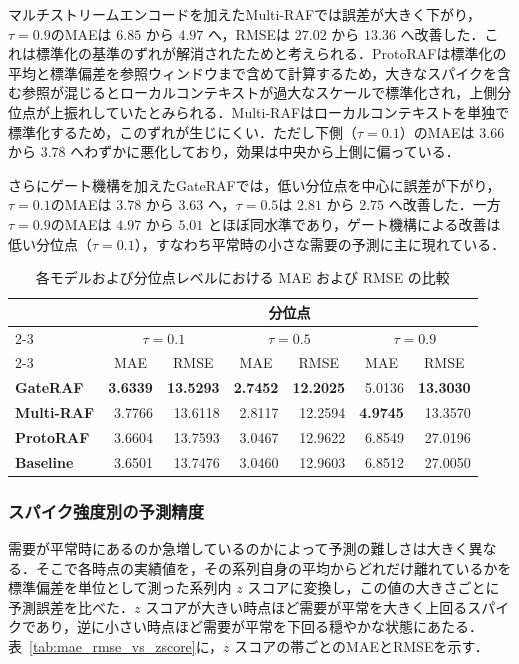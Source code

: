\documentclass[twocolumn, lastpage]{jarticle}
\begin{document}
マルチストリームエンコードを加えたMulti-RAFでは誤差が大きく下がり，$\tau=0.9$のMAEは $6.85$ から $4.97$ へ，RMSEは $27.02$ から $13.36$ へ改善した．これは標準化の基準のずれが解消されたためと考えられる．ProtoRAFは標準化の平均と標準偏差を参照ウィンドウまで含めて計算するため，大きなスパイクを含む参照が混じるとローカルコンテキストが過大なスケールで標準化され，上側分位点が上振れしていたとみられる．Multi-RAFはローカルコンテキストを単独で標準化するため，このずれが生じにくい．ただし下側（$\tau=0.1$）のMAEは $3.66$ から $3.78$ へわずかに悪化しており，効果は中央から上側に偏っている．

さらにゲート機構を加えたGateRAFでは，低い分位点を中心に誤差が下がり，$\tau=0.1$のMAEは $3.78$ から $3.63$ へ，$\tau=0.5$は $2.81$ から $2.75$ へ改善した．一方 $\tau=0.9$のMAEは $4.97$ から $5.01$ とほぼ同水準であり，ゲート機構による改善は低い分位点（$\tau=0.1$），すなわち平常時の小さな需要の予測に主に現れている．
    \begin{table}[t]
        \caption{各モデルおよび分位点レベルにおける MAE および RMSE の比較}
        \label{tab:metric_comparison}
        \centering
        \begin{tabular}{lrrrrrr}
            \hline
            & \multicolumn{6}{c}{分位点} \\
            \cline{2-3} \cline{4-5} \cline{6-7}
            \multicolumn{1}{c}{モデル} & \multicolumn{2}{c}{$\tau=0.1$} & \multicolumn{2}{c}{$\tau=0.5$} & \multicolumn{2}{c}{$\tau=0.9$} \\
            \cline{2-3} \cline{4-5} \cline{6-7}
            & \multicolumn{1}{c}{MAE} & \multicolumn{1}{c}{RMSE} & \multicolumn{1}{c}{MAE} & \multicolumn{1}{c}{RMSE} & \multicolumn{1}{c}{MAE} & \multicolumn{1}{c}{RMSE} \\
            \hline\hline
            \textbf{GateRAF} & \textbf{3.6339} & \textbf{13.5293} & \textbf{2.7452} & \textbf{12.2025} & 5.0136 & \textbf{13.3030} \\
            \textbf{Multi-RAF} & 3.7766 & 13.6118 & 2.8117 & 12.2594 & \textbf{4.9745} & 13.3570 \\
            \textbf{ProtoRAF} & 3.6604 & 13.7593 & 3.0467 & 12.9622 & 6.8549 & 27.0196 \\
            \textbf{Baseline} & 3.6501 & 13.7476 & 3.0460 & 12.9603 & 6.8512 & 27.0050 \\
            \hline
        \end{tabular}
    \end{table}


\subsubsection{スパイク強度別の予測精度}
需要が平常時にあるのか急増しているのかによって予測の難しさは大きく異なる．そこで各時点の実績値を，その系列自身の平均からどれだけ離れているかを標準偏差を単位として測った系列内 $z$ スコアに変換し，この値の大きさごとに予測誤差を比べた．$z$ スコアが大きい時点ほど需要が平常を大きく上回るスパイクであり，逆に小さい時点ほど需要が平常を下回る穏やかな状態にあたる．表~\ref{tab:mae_rmse_vs_zscore}に，$z$ スコアの帯ごとのMAEとRMSEを示す．
\end{document}
